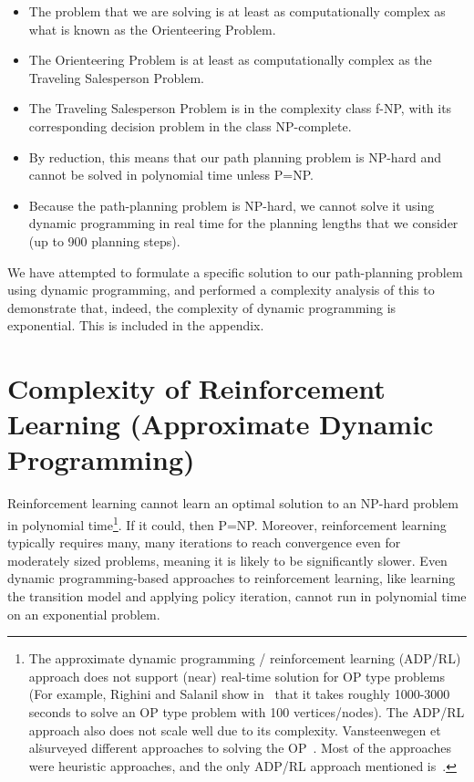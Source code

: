 \begin{itemize}
\item The problem that we are solving is at least as computationally complex as what is known as the Orienteering Problem.  
\item The Orienteering Problem is at least as computationally complex as the Traveling Salesperson Problem.
\item The Traveling Salesperson Problem is in the complexity class f-NP, with its corresponding decision problem in the class NP-complete.
\item By reduction, this means that our path planning problem is NP-hard and cannot be solved in polynomial time unless P=NP.
\item Because the path-planning problem is NP-hard, we cannot solve it using dynamic programming in real time for the planning lengths that we consider (up to 900 planning steps).
\end{itemize}


We have attempted to formulate a specific solution to our path-planning problem using dynamic programming, and performed a complexity analysis of this to demonstrate that, indeed, the complexity of dynamic programming is exponential.  This is included in the appendix.

\section{Complexity of Reinforcement Learning (Approximate Dynamic Programming)}
\label{RLComplexity}

Reinforcement learning cannot learn an optimal solution to an NP-hard problem in polynomial time\footnote{The approximate dynamic programming / reinforcement learning (ADP/RL) approach does not support (near) real-time solution for OP type problems (For example, Righini and Salanil show in~\cite{Righini2009Decremental} that it takes roughly 1000-3000 seconds to solve an OP type problem with 100 vertices/nodes). The ADP/RL approach also does not scale well due to its complexity. Vansteenwegen et al\. surveyed different approaches to solving the OP~\cite{Vansteenwegen2011Orienteering}. Most of the approaches were heuristic approaches, and the only ADP/RL approach mentioned is~\cite{Righini2009Decremental}.}. If it could, then P=NP. Moreover, reinforcement learning typically requires many, many iterations to reach convergence even for moderately sized problems, meaning it is likely to be significantly slower.  Even dynamic programming-based approaches to reinforcement learning, like learning the transition model and applying policy iteration, cannot run in polynomial time on an exponential problem.

